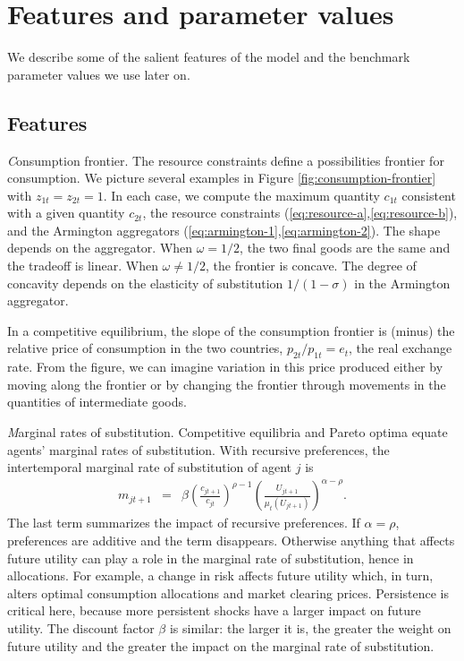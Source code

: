 
\section{Features and parameter values}


We describe some of the salient features of the model
and the benchmark parameter values we use later on.


\subsection{Features}

{\textit Consumption frontier.\/}
The resource constraints define a possibilities frontier for consumption.
We picture several examples in Figure \ref{fig:consumption-frontier}
with $z_{1t} = z_{2t} = 1$.
In each case, we compute the maximum quantity
$c_{1t}$ consistent with a given quantity $c_{2t}$,
the resource constraints (\ref{eq:resource-a},\ref{eq:resource-b}),
and the Armington aggregators (\ref{eq:armington-1},\ref{eq:armington-2}).
The shape depends on the aggregator.
When $\omega = 1/2$, the two final goods are the same and the tradeoff is linear.
When $\omega \neq 1/2$, the frontier is concave.
The degree of concavity depends on the elasticity of substitution $ 1/(1-\sigma)$
in the Armington aggregator.


In a competitive equilibrium, the slope of the consumption frontier
is (minus) the relative price of consumption in the two countries, $p_{2t}/p_{1t} = e_t$,
the real exchange rate.
From the figure, we can imagine variation in this price
produced either by moving along the frontier or by changing the frontier through
movements in the quantities of intermediate goods.

{\textit Marginal rates of substitution.\/}
Competitive equilibria and Pareto optima equate agents' marginal rates of substitution.
With recursive preferences, the intertemporal marginal rate of substitution of agent $j$ is
\begin{eqnarray}
    m_{jt+1} &=& \beta \left( \frac{c_{jt+1}}{c_{jt}}\right)^{\rho-1}
              \left( \frac{U_{jt+1}}{\mu_{t}(U_{jt+1})} \right)^{\alpha-\rho} .
              \label{eq:mrs}
\end{eqnarray}
The last term summarizes the impact of recursive preferences.
If $\alpha=\rho$, preferences are additive and the term disappears.
Otherwise anything that affects future utility can play a role in the marginal rate
of substitution, hence in allocations.
For example, a change in risk affects future utility which, in turn, alters optimal consumption allocations and market clearing prices.
Persistence is critical here, because more persistent shocks have a larger
impact on future utility.
The discount factor $\beta$ is similar:  the larger it is, the greater the weight on
future utility and the greater the impact on the marginal rate of substitution.

